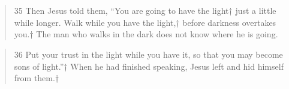 \documentclass[11pt,a4paper]{scrartcl} %
\begin{document}
\begin{center}
\textcolor{Maroon}{}\\
\textcolor{brown}{}\\
\end{center}
\begin{verse}
35 Then Jesus told them, “You are going to have the light† just a little while longer. Walk while you have the light,† before darkness overtakes you.† The man who walks in the dark does not know where he is going.
\end{verse}
\begin{verse}
 36 Put your trust in the light while you have it, so that you may become sons of light.”† When he had finished speaking, Jesus left and hid himself from them.† 
\end{verse}
\end{document}
